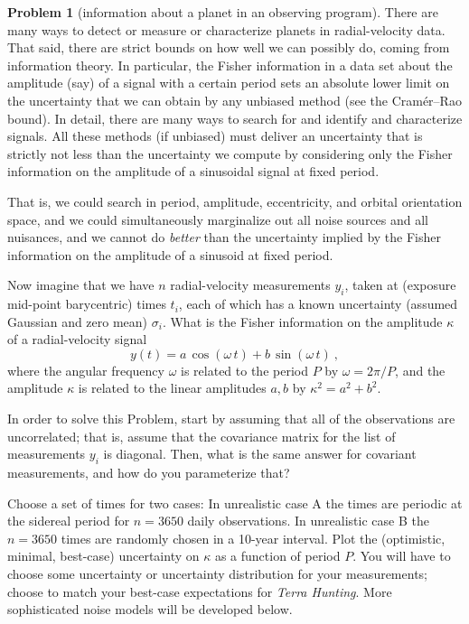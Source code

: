 \documentclass{article}
\theoremstyle{definition}
\newcommand{\problemname}{Problem}
\newtheorem{problem}{\problemname}
\theoremstyle{remark}
\begin{document}
\begin{problem}[information about a planet in an observing program]\label{prob:info}
There are many ways to detect or measure or characterize planets in radial-velocity data.
That said, there are strict bounds on how well we can possibly do, coming from information theory.
In particular, the Fisher information in a data set about the amplitude (say) of a signal with a certain period sets an absolute lower limit on the uncertainty that we can obtain by any unbiased method (see the Cram\'er--Rao bound).
In detail, there are many ways to search for and identify and characterize signals.
All these methods (if unbiased) must deliver an uncertainty that is strictly not less than the uncertainty we compute by considering only the Fisher information on the amplitude of a sinusoidal signal at fixed period.

That is, we could search in period, amplitude, eccentricity, and orbital orientation space, and we could simultaneously marginalize out all noise sources and all nuisances, and we cannot do \emph{better} than the uncertainty implied by the Fisher information on the amplitude of a sinusoid at fixed period.

Now imagine that we have $n$ radial-velocity measurements $y_i$, taken at (exposure mid-point barycentric) times $t_i$, each of which has a known uncertainty (assumed Gaussian and zero mean) $\sigma_i$.
What is the Fisher information on the amplitude $\kappa$ of a radial-velocity signal
\begin{equation}
y(t) = a\,\cos(\omega\,t) + b\,\sin(\omega\,t) ~,\label{eq:sine}
\end{equation}
where the angular frequency $\omega$ is related to the period $P$ by $\omega = 2\pi/P$,
and the amplitude $\kappa$ is related to the linear amplitudes $a,b$ by $\kappa^2=a^2+b^2$.

In order to solve this \problemname{}, start by assuming that all of the observations are uncorrelated; that is, assume that the covariance matrix for the list of measurements $y_i$ is diagonal.
Then, what is the same answer for covariant measurements, and how do you parameterize that?

Choose a set of times for two cases:
In unrealistic case A the times are periodic at the sidereal period for $n=3650$ daily observations.
In unrealistic case B the $n=3650$ times are randomly chosen in a 10-year interval.
Plot the (optimistic, minimal, best-case) uncertainty on $\kappa$ as a function of period $P$.
You will have to choose some uncertainty or uncertainty distribution for your measurements; choose to match your best-case expectations for \textsl{Terra Hunting}.
More sophisticated noise models will be developed below.
\end{problem}
\end{document}
